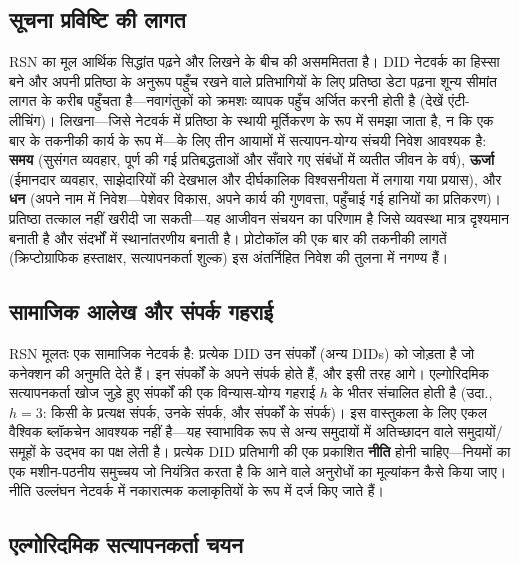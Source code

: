 \documentclass[11pt,a4paper,twocolumn]{article}
\begin{document}
\subsection{सूचना प्रविष्टि की लागत}

RSN का मूल आर्थिक सिद्धांत पढ़ने और लिखने के बीच की असममितता है। DID नेटवर्क का हिस्सा बने और अपनी प्रतिष्ठा के अनुरूप पहुँच रखने वाले प्रतिभागियों के लिए प्रतिष्ठा डेटा पढ़ना शून्य सीमांत लागत के करीब पहुँचता है---नवागंतुकों को क्रमशः व्यापक पहुँच अर्जित करनी होती है (देखें एंटी-लीचिंग)। लिखना---जिसे नेटवर्क में प्रतिष्ठा के स्थायी मूर्तिकरण के रूप में समझा जाता है, न कि एक बार के तकनीकी कार्य के रूप में---के लिए तीन आयामों में सत्यापन-योग्य संचयी निवेश आवश्यक है: \textbf{समय} (सुसंगत व्यवहार, पूर्ण की गई प्रतिबद्धताओं और सँवारे गए संबंधों में व्यतीत जीवन के वर्ष), \textbf{ऊर्जा} (ईमानदार व्यवहार, साझेदारियों की देखभाल और दीर्घकालिक विश्वसनीयता में लगाया गया प्रयास), और \textbf{धन} (अपने नाम में निवेश---पेशेवर विकास, अपने कार्य की गुणवत्ता, पहुँचाई गई हानियों का प्रतिकरण)। प्रतिष्ठा तत्काल नहीं खरीदी जा सकती---यह आजीवन संचयन का परिणाम है जिसे व्यवस्था मात्र दृश्यमान बनाती है और संदर्भों में स्थानांतरणीय बनाती है। प्रोटोकॉल की एक बार की तकनीकी लागतें (क्रिप्टोग्राफिक हस्ताक्षर, सत्यापनकर्ता शुल्क) इस अंतर्निहित निवेश की तुलना में नगण्य हैं।

\subsection{सामाजिक आलेख और संपर्क गहराई}

RSN मूलतः एक सामाजिक नेटवर्क है: प्रत्येक DID उन संपर्कों (अन्य DIDs) को जोड़ता है जो कनेक्शन की अनुमति देते हैं। इन संपर्कों के अपने संपर्क होते हैं, और इसी तरह आगे। एल्गोरिदमिक सत्यापनकर्ता खोज जुड़े हुए संपर्कों की एक विन्यास-योग्य गहराई $h$ के भीतर संचालित होती है (उदा., $h=3$: किसी के प्रत्यक्ष संपर्क, उनके संपर्क, और संपर्कों के संपर्क)। इस वास्तुकला के लिए एकल वैश्विक ब्लॉकचेन आवश्यक नहीं है---यह स्वाभाविक रूप से अन्य समुदायों में अतिच्छादन वाले समुदायों/समूहों के उद्भव का पक्ष लेती है। प्रत्येक DID प्रतिभागी की एक प्रकाशित \textbf{नीति} होनी चाहिए---नियमों का एक मशीन-पठनीय समुच्चय जो नियंत्रित करता है कि आने वाले अनुरोधों का मूल्यांकन कैसे किया जाए। नीति उल्लंघन नेटवर्क में नकारात्मक कलाकृतियों के रूप में दर्ज किए जाते हैं।

\subsection{एल्गोरिदमिक सत्यापनकर्ता चयन}
\end{document}
